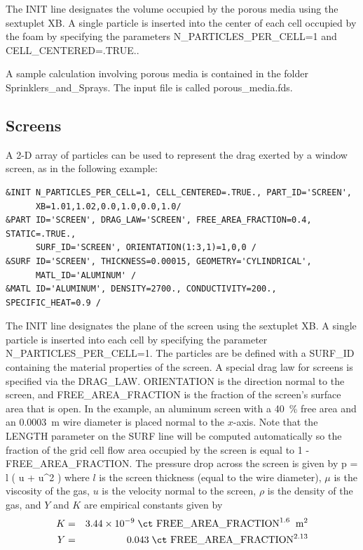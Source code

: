 \documentclass[11pt]{book}
\begin{document}
The {\ct INIT} line designates the volume occupied by the porous media using the sextuplet {\ct XB}. A single particle is inserted into the center of each cell occupied by the foam by specifying the parameters {\ct N\_PARTICLES\_PER\_CELL=1} and {\ct CELL\_CENTERED=.TRUE.}.

A sample calculation involving porous media is contained in the folder {\ct Sprinklers\_and\_Sprays}. The input file is called {\ct porous\_media.fds}.

\subsection{Screens}
\label{info:particle_screen}

A 2-D array of particles can be used to represent the drag exerted by a window screen, as in the following example:
\begin{lstlisting}
&INIT N_PARTICLES_PER_CELL=1, CELL_CENTERED=.TRUE., PART_ID='SCREEN',
      XB=1.01,1.02,0.0,1.0,0.0,1.0/
&PART ID='SCREEN', DRAG_LAW='SCREEN', FREE_AREA_FRACTION=0.4, STATIC=.TRUE.,
      SURF_ID='SCREEN', ORIENTATION(1:3,1)=1,0,0 /
&SURF ID='SCREEN', THICKNESS=0.00015, GEOMETRY='CYLINDRICAL',
      MATL_ID='ALUMINUM' /
&MATL ID='ALUMINUM', DENSITY=2700., CONDUCTIVITY=200., SPECIFIC_HEAT=0.9 /
\end{lstlisting}
The {\ct INIT} line designates the plane of the screen using the sextuplet {\ct XB}. A single particle is inserted into each cell by specifying the parameter {\ct N\_PARTICLES\_PER\_CELL=1}.  The particles are be defined with a {\ct SURF\_ID} containing the material properties of the screen.  A special drag law for screens is specified via the {\ct DRAG\_LAW}.  {\ct ORIENTATION} is the direction normal to the screen, and {\ct FREE\_AREA\_FRACTION} is the fraction of the screen's surface area that is open. In the example, an aluminum screen with a 40~\% free area and an 0.0003~m wire diameter is placed normal to the $x$-axis.  Note that the {\ct LENGTH} parameter on the {\ct SURF} line will be computed automatically so the fraction of the grid cell flow area occupied by the screen is equal to 1 - {\ct FREE\_AREA\_FRACTION}. The pressure drop across the screen is given by
\be
   \Delta p =  l \; \left( u + \rho {} u^2 \right)
\ee
where $l$ is the screen thickness (equal to the wire diameter), $\mu$ is the viscosity of the gas, $u$ is the velocity normal to the screen, $\rho$ is the density of the gas, and $Y$ and $K$ are empirical constants given by
\begin{eqnarray}
   K &=& 3.44 \times 10^{-9} \; \hbox{\ct FREE\_AREA\_FRACTION}^{1.6} \; \; \hbox{m}^2 \\
   Y &=& 0.043 \; \hbox{\ct FREE\_AREA\_FRACTION}^{2.13}
\end{eqnarray}
\end{document}
